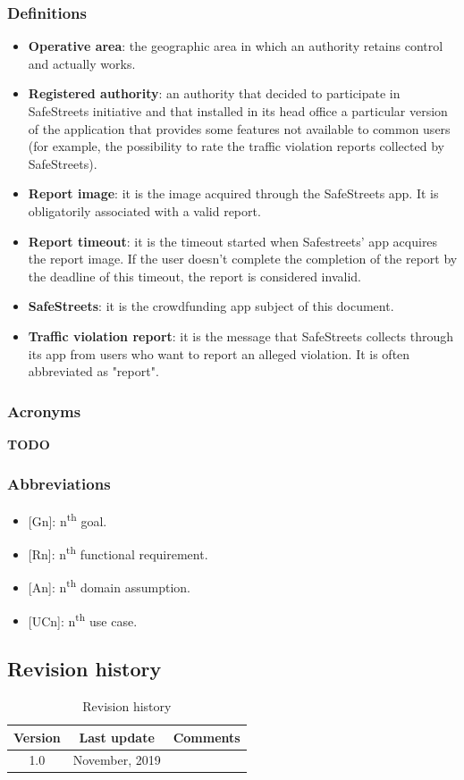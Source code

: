 \documentclass{article}
\begin{document}
			\subsubsection{Definitions}
				\begin{itemize}
					\item \textbf{Operative area}: the geographic area in which an authority retains  control and actually works.
					\item \textbf{Registered authority}: an authority that decided to participate in SafeStreets initiative and that installed in its head office a particular version of the application that provides some features not available to common users (for example, the possibility to rate the traffic violation reports collected by SafeStreets).
					\item \textbf{Report image}: it is the image acquired through the SafeStreets app. It is obligatorily associated with a valid report.
					\item \textbf{Report timeout}: it is the timeout started when Safestreets' app acquires the report image. If the user doesn't complete the completion of the report by the deadline of this timeout, the report is considered invalid.
					\item \textbf{SafeStreets}: it is the crowdfunding app subject of this document.
					\item \textbf{Traffic violation report}: it is the message that SafeStreets collects through its app from users who want to report an alleged violation. It is often abbreviated as "report".
				\end{itemize}
			\subsubsection{Acronyms}
			 \textbf{TODO}
			\subsubsection{Abbreviations}
				\begin{itemize}
					\item {[Gn]}: n\textsuperscript{th} goal.
					\item {[Rn]}: n\textsuperscript{th} functional requirement.
					\item {[An]}: n\textsuperscript{th} domain assumption.
					\item {[UCn]}: n\textsuperscript{th} use case.
				\end{itemize}
		\subsection{Revision history}
			\begin{table}[h]
				\centering
				\begin{tabular}{c c c}
					\hline
					\textbf{Version} & \textbf{Last update} & \textbf{Comments} \\ 
					\hline
					1.0 &  \nth{10} November, 2019  & \\
					\hline
				\end{tabular}
				\caption{Revision history}
				\label{fig:Revision history}
			\end{table}
		
\end{document}
